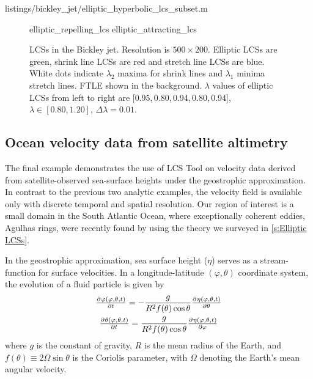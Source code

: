 \documentclass{article}
\newlength\figurewidth
\begin{document}

{listings/bickley_jet/elliptic_hyperbolic_lcs_subset.m}

\begin{figure}
\centering
\setlength{}
{elliptic_repelling_lcs}
{elliptic_attracting_lcs}
\caption{
LCSs in the Bickley jet.
Resolution is $500 \times 200$.
Elliptic LCSs are green, shrink line LCSs are red and stretch line LCSs are blue.
White dots indicate $\lambda_2$ maxima for shrink lines and $\lambda_1$ minima stretch lines.
FTLE shown in the background.
$\lambda$ values of elliptic LCSs from left to right are [0.95,\,0.80,\,0.94,\,0.80,\,0.94], $\lambda \in [0.80,1.20]$, $\Delta\lambda = 0.01$.
}
\label{f:Bickley jet LCS}
\end{figure}

\subsection{Ocean velocity data from satellite altimetry}
\label{s:oceandataset}

The final example demonstrates the use of LCS Tool on velocity data derived from satellite-observed sea-surface heights under the geostrophic approximation. In contrast to the previous two analytic examples, the velocity field is available only with discrete temporal and spatial resolution. Our region of interest is a small domain in the South Atlantic Ocean, where exceptionally coherent eddies, Agulhas rings, were recently found by \textcite{haller13:_coher_lagran,haller14:_adden_coher_lagran} using the theory we surveyed in \cref{s:Elliptic LCSs}.

In the geostrophic approximation, sea surface height ($\eta$) serves as a stream-function for surface velocities. In a longitude-latitude $(\varphi,\theta)$ coordinate system, the evolution of a fluid particle is given by
\begin{gather}
\pd{\varphi(\varphi,\theta,t)}{t} = -\frac{g}{R^2 f(\theta) \cos\theta} \pd{\eta(\varphi,\theta,t)}{\theta}\label{eq:dtlon}\\
\pd{\theta(\varphi,\theta,t)}{t} = \frac{g}{R^2 f(\theta) \cos\theta}\pd{\eta(\varphi,\theta,t)}{\varphi}
\label{eq:dtlat}
\end{gather}
where $g$ is the constant of gravity, $R$ is the mean radius of the Earth, and $f(\theta) \equiv 2\Omega\sin\theta$ is the Coriolis parameter, with $\Omega$ denoting the Earth's mean angular velocity.
\end{document}
